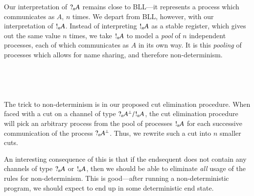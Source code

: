 \documentclass[twocolumn]{article}
\begin{document}
Our interpretation of $\give[n]{A}$ remains close to BLL---it represents a
process which communicates as $A$, $n$ times.
We depart from BLL, however, with our interpretation of $\take[n]{A}$.
Instead of interpreting $\take[n]{A}$ as a stable register, which gives out the
same value $n$ times, we take $\take[n]{A}$ to model a \emph{pool} of $n$
independent processes, each of which communicates as $A$ in its own way.
It is this \emph{pooling} of processes which allows for name sharing, and
therefore non-determinism.
\begin{center}
  \begin{proofbox}
  \end{proofbox}
  \\[1\baselineskip]
  \begin{proofbox}
    \SYM{\take[1]{}}
  \end{proofbox}
  \begin{proofbox}
    \SYM{\give{}}
  \end{proofbox}
  \\[1\baselineskip]
  \begin{proofbox}
  \end{proofbox}
\end{center}
The trick to non-determinism is in our proposed cut elimination procedure.
When faced with a cut on a channel of type $\give[n]{A^\bot} / \take[n]{A}$, the
cut elimination procedure will pick an arbitrary process from the pool of
processes $\take[n]{A}$ for each successive communication of the process
$\give[n]{A^\bot}$.
Thus, we rewrite such a cut into $n$ smaller cuts. 

An interesting consequence of this is that if the endsequent does not contain
any channels of type $\give[n]{A}$ or $\take[n]{A}$, then we should be able to
eliminate \emph{all} usage of the rules for non-determinism. This is
good---after running a non-deterministic program, we should expect to end up in
some deterministic end state.
\end{document}
